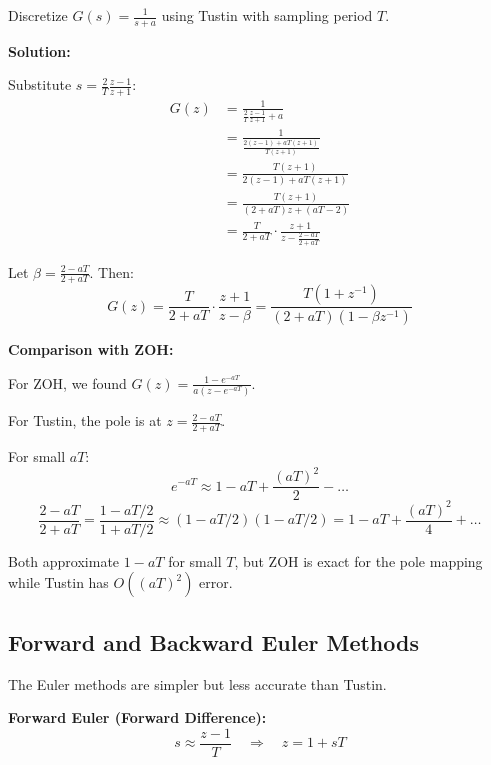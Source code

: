 \begin{example}
\label{ex:tustin_first_order}

Discretize $G(s) = \frac{1}{s+a}$ using Tustin with sampling period $T$.

\textbf{Solution:}

Substitute $s = \frac{2}{T}\frac{z-1}{z+1}$:
\begin{align}
G(z) &= \frac{1}{\frac{2}{T}\frac{z-1}{z+1} + a} \\
&= \frac{1}{\frac{2(z-1) + aT(z+1)}{T(z+1)}} \\
&= \frac{T(z+1)}{2(z-1) + aT(z+1)} \\
&= \frac{T(z+1)}{(2+aT)z + (aT-2)} \\
&= \frac{T}{2+aT} \cdot \frac{z+1}{z - \frac{2-aT}{2+aT}}
\end{align}

Let $\beta = \frac{2-aT}{2+aT}$. Then:
\begin{equation}
\boxed{G(z) = \frac{T}{2+aT} \cdot \frac{z+1}{z-\beta} = \frac{T(1+z^{-1})}{(2+aT)(1-\beta z^{-1})}}
\end{equation}

\textbf{Comparison with ZOH:}

For ZOH, we found $G(z) = \frac{1-e^{-aT}}{a(z-e^{-aT})}$.

For Tustin, the pole is at $z = \frac{2-aT}{2+aT}$.

For small $aT$:
\begin{equation}
e^{-aT} \approx 1 - aT + \frac{(aT)^2}{2} - \ldots
\end{equation}
\begin{equation}
\frac{2-aT}{2+aT} = \frac{1 - aT/2}{1 + aT/2} \approx (1 - aT/2)(1 - aT/2) = 1 - aT + \frac{(aT)^2}{4} + \ldots
\end{equation}

Both approximate $1 - aT$ for small $T$, but ZOH is exact for the pole mapping while Tustin has $O((aT)^2)$ error.
\end{example}

\subsection{Forward and Backward Euler Methods}

The Euler methods are simpler but less accurate than Tustin.

\textbf{Forward Euler (Forward Difference):}
\begin{equation}
s \approx \frac{z-1}{T} \quad \Rightarrow \quad z = 1 + sT
\label{eq:forward_euler}
\end{equation}

